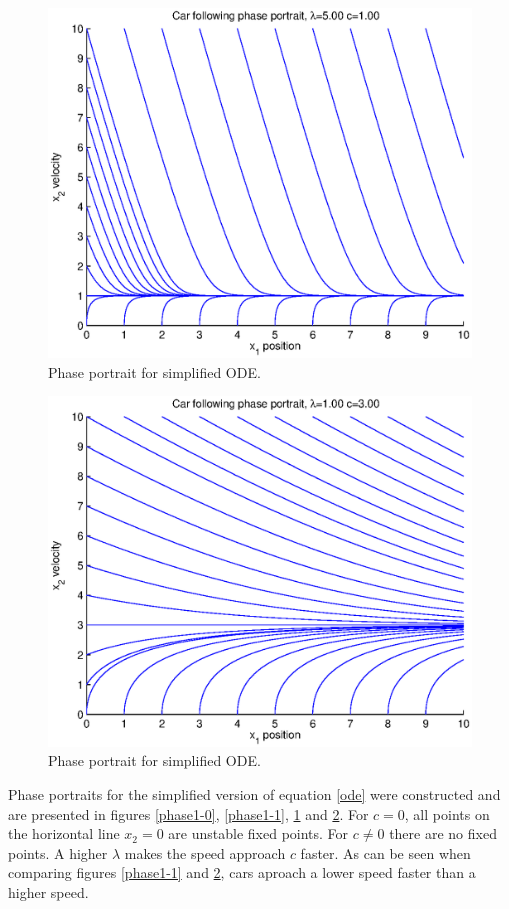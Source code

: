 \documentclass[11pt,a4paper]{article}
\begin{document}
\begin{figure}[ht]
\centering
\includegraphics[width=400pt]{phase5-1}
\caption{Phase portrait for simplified ODE.}
\label{phase5-1}
\end{figure}

\begin{figure}[ht]
\centering
\includegraphics[width=400pt]{phase1-3}
\caption{Phase portrait for simplified ODE.}
\label{phase1-3}
\end{figure}

Phase portraits for the simplified version of equation \ref{ode} were constructed and are
presented in figures \ref{phase1-0}, \ref{phase1-1}, \ref{phase5-1} and
\ref{phase1-3}. For
$c=0$, all points on the horizontal line $x_2=0$ are unstable fixed points. For
$c \neq 0$ there are no fixed points. A higher $\lambda$ makes the speed
approach $c$ faster. As can be seen when comparing figures \ref{phase1-1} and
\ref{phase1-3}, cars aproach a lower speed faster than a higher speed.
\end{document}
